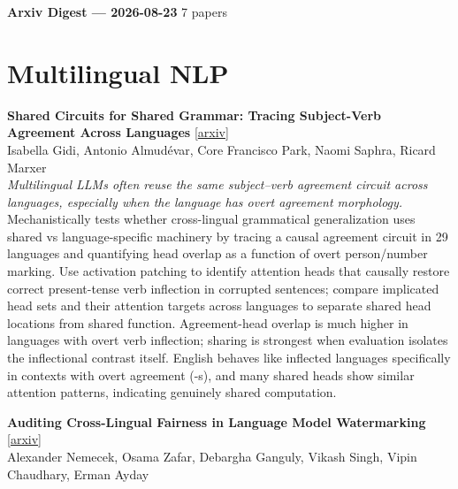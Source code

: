 \documentclass[12pt,letterpaper]{article}
\begin{document}
{\footnotesize\textbf{Arxiv Digest --- 2026-08-23} \hfill 7 papers}

\smallskip

\section*{Multilingual NLP}

{\small\textbf{Shared Circuits for Shared Grammar: Tracing Subject-Verb Agreement Across Languages}} {\scriptsize[\href{https://arxiv.org/abs/2608.18545}{arxiv}]}\\
{\scriptsize Isabella Gidi, Antonio Almudévar, Core Francisco Park, Naomi Saphra, Ricard Marxer}\\

{\small\textit{Multilingual LLMs often reuse the same subject--verb agreement circuit across languages, especially when the language has overt agreement morphology.}}\\[1pt]
{\footnotesize Mechanistically tests whether cross-lingual grammatical generalization uses shared vs language-specific machinery by tracing a causal agreement circuit in 29 languages and quantifying head overlap as a function of overt person/number marking. Use activation patching to identify attention heads that causally restore correct present-tense verb inflection in corrupted sentences; compare implicated head sets and their attention targets across languages to separate shared head locations from shared function. Agreement-head overlap is much higher in languages with overt verb inflection; sharing is strongest when evaluation isolates the inflectional contrast itself. English behaves like inflected languages specifically in contexts with overt agreement (-s), and many shared heads show similar attention patterns, indicating genuinely shared computation.}

\medskip

{\small\textbf{Auditing Cross-Lingual Fairness in Language Model Watermarking}} {\scriptsize[\href{https://arxiv.org/abs/2608.20047}{arxiv}]}\\
{\scriptsize Alexander Nemecek, Osama Zafar, Debargha Ganguly, Vikash Singh, Vipin Chaudhary, Erman Ayday}\\
\end{document}
